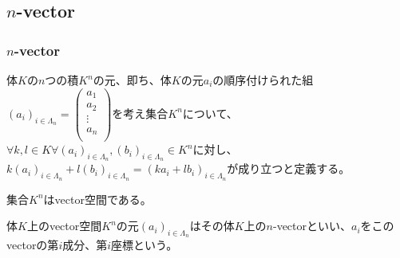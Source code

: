 \documentclass[dvipdfmx]{jsarticle}
\begin{document}
\subsection{$n$-vector}%
\subsubsection{$n$-vector}%
\begin{dfn}
体$K$の$n$つの積$K^{n}$の元、即ち、体$K$の元$a_{i}$の順序付けられた組$\left( a_{i} \right)_{i \in \varLambda_{n}} = \begin{pmatrix}
a_{1} \\
a_{2} \\
 \vdots \\
a_{n} \\
\end{pmatrix}$を考え集合$K^{n}$について、$\forall k,l \in K\forall\left( a_{i} \right)_{i \in \varLambda_{n}},\left( b_{i} \right)_{i \in \varLambda_{n}} \in K^{n}$に対し、$k\left( a_{i} \right)_{i \in \varLambda_{n}} + l\left( b_{i} \right)_{i \in \varLambda_{n}} = \left( ka_{i} + lb_{i} \right)_{i \in \varLambda_{n}}$が成り立つと定義する。
\end{dfn}
\begin{thm}\label{2.1.4.1}
集合$K^{n}$はvector空間である。
\end{thm}
\begin{dfn}
体$K$上のvector空間$K^{n}$の元$\left( a_{i} \right)_{i \in \varLambda_{n}}$はその体$K$上の$n$-vectorといい、$a_{i}$をこのvectorの第$i$成分、第$i$座標という。
\end{dfn}
\end{document}
